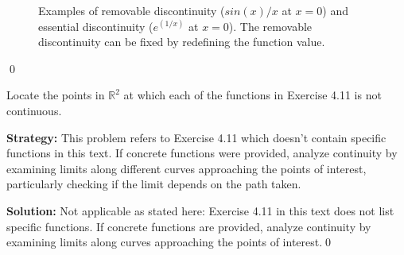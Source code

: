 \begin{figure}[h]
\centering
{}
\caption{Examples of removable discontinuity ($sin(x)/x$ at $x=0$) and essential discontinuity ($e^(1/x)$ at $x=0$). The removable discontinuity can be fixed by redefining the function value.}
\end{figure}\qed



\begin{problembox}
\begin{problemstatement}
Locate the points in $\mathbb{R}^2$ at which each of the functions in Exercise 4.11 is not continuous.
\end{problemstatement}
\end{problembox}

\noindent\textbf{Strategy:} This problem refers to Exercise 4.11 which doesn't contain specific functions in this text. If concrete functions were provided, analyze continuity by examining limits along different curves approaching the points of interest, particularly checking if the limit depends on the path taken.

\bigskip\noindent\textbf{Solution:}
Not applicable as stated here: Exercise 4.11 in this text does not list specific functions. If concrete functions are provided, analyze continuity by examining limits along curves approaching the points of interest.\qed

